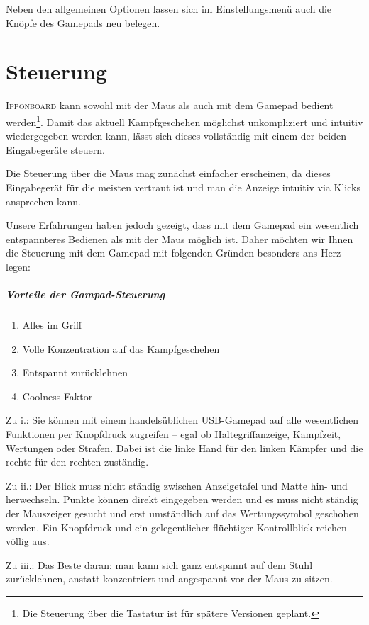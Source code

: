 \documentclass[ngerman,12pt,numbers=noenddot]{scrreprt}
\newcommand*{\ipponboard}{
\fontspec[
]{Cuprum}
\selectfont 
\textsc{Ipponboard}}
\begin{document}
{Neben den allgemeinen Optionen lassen sich im Einstellungsmen\"u auch die Kn\"opfe des Gamepads neu belegen.

\chapter{Steuerung}

{\ipponboard} kann sowohl mit der Maus als auch mit dem Gamepad bedient werden\footnote{Die Steuerung \"uber die Tastatur ist f\"ur sp\"atere Versionen geplant.}. Damit das aktuell Kampfgeschehen m\"oglichst unkompliziert und intuitiv wiedergegeben werden kann, l\"asst sich dieses vollst\"andig mit einem der beiden Eingabeger\"ate
steuern.

Die Steuerung \"uber die Maus mag zun\"achst einfacher erscheinen, da dieses Eingabeger\"at f\"ur die meisten vertraut ist und man die Anzeige intuitiv via Klicks ansprechen kann.

Unsere Erfahrungen haben jedoch gezeigt, dass mit dem Gamepad ein wesentlich entspannteres Bedienen als mit der Maus m\"oglich ist. Daher m\"ochten wir Ihnen die Steuerung mit dem Gamepad mit folgenden Gr\"unden besonders ans Herz legen:

\paragraph*{Vorteile der Gampad-Steuerung}
\begin{enumerate}
	\item Alles im Griff
	\item Volle Konzentration auf das Kampfgeschehen
	\item Entspannt zur\"ucklehnen
	\item Coolness-Faktor
\end{enumerate}

Zu i.: Sie k\"onnen mit einem handels\"ublichen USB-Gamepad auf alle wesentlichen Funktionen per Knopfdruck zugreifen -- egal ob Haltegriffanzeige, Kampfzeit, Wertungen oder Strafen. Dabei ist die linke Hand f\"ur den linken K\"ampfer und die rechte f\"ur den rechten zust\"andig.

Zu ii.: Der Blick muss nicht st\"andig zwischen Anzeigetafel und Matte hin- und herwechseln. Punkte k\"onnen direkt eingegeben werden und es muss nicht st\"andig der Mauszeiger gesucht und erst umst\"andlich auf
das Wertungssymbol geschoben werden. Ein Knopfdruck und ein gelegentlicher fl\"uchtiger Kontrollblick reichen v\"ollig aus.

Zu iii.: Das Beste daran: man kann sich ganz entspannt auf dem Stuhl zur\"ucklehnen, anstatt konzentriert und angespannt vor der Maus zu sitzen.

}
\end{document}
